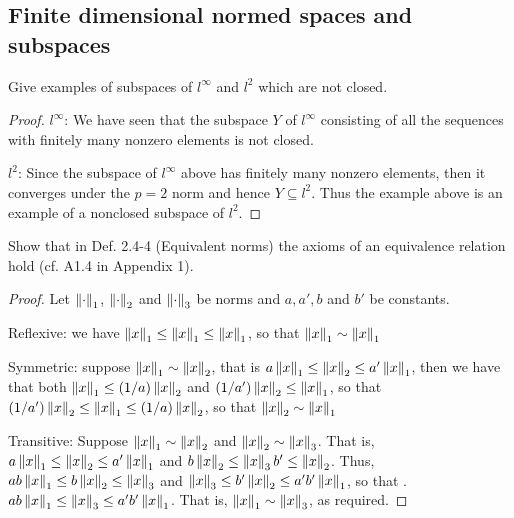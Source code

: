 \subsection{Finite dimensional normed spaces and subspaces}


\begin{exercise}{1}
Give examples of subspaces of $l^\infty$ and $l^2$ which are not closed.
\end{exercise}
\begin{proof}
$l^\infty$: We have seen that the subspace $Y$ of $l^\infty$ consisting of all the sequences with finitely many nonzero elements is not closed.

$l^2$: Since the subspace of $l^\infty$ above has finitely many nonzero elements, then it converges under the $p=2$ norm and hence $Y\subseteq l^2$. Thus the example above is an example of a nonclosed subspace of $l^2$.
\end{proof}

\begin{exercise}{3}
Show that in Def. 2.4-4 (Equivalent norms) the axioms of an equivalence relation hold (cf. A1.4 in Appendix 1).
\end{exercise}
\begin{proof}
Let $\left\lVert \cdot\right\rVert_1$, $\left\lVert \cdot\right\rVert_2$ and $\left\lVert \cdot\right\rVert_3$ be norms and $a,a',b$ and $b'$ be constants.

Reflexive: we have $\left\lVert x\right\rVert_1 \leq\left\lVert x\right\rVert_1 \leq \left\lVert x\right\rVert_1$, so that $\left\lVert x\right\rVert_1\sim \left\lVert x\right\rVert_1$

Symmetric: suppose $\left\lVert x\right\rVert_1\sim \left\lVert x\right\rVert_2$, that is $a\left\lVert x\right\rVert_1 \leq\left\lVert x\right\rVert_2 \leq a'\left\lVert x\right\rVert_1$, then we have that both $\left\lVert x\right\rVert_1\leq (1/a)\left\lVert x\right\rVert_2$ and $(1/a')\left\lVert x\right\rVert_2 \leq \left\lVert x\right\rVert_1$, so that $(1/a')\left\lVert x\right\rVert_2 \leq\left\lVert x\right\rVert_1 \leq (1/a)\left\lVert x\right\rVert_2$, so that $\left\lVert x\right\rVert_2 \sim \left\lVert x\right\rVert_1$

Transitive: Suppose $\left\lVert x\right\rVert_1\sim \left\lVert x\right\rVert_2$ and $\left\lVert x\right\rVert_2 \sim \left\lVert x\right\rVert_3$. That is, $a\left\lVert x\right\rVert_1 \leq \left\lVert x\right\rVert_2 \leq a'\left\lVert x\right\rVert_1$ and $b\left\lVert x\right\rVert_2 \leq \left\lVert x\right\rVert_3 b'\leq \left\lVert x\right\rVert_2$. Thus, $ab\left\lVert x\right\rVert_1 \leq b\left\lVert x\right\rVert_2 \leq \left\lVert x\right\rVert_3$ and $\left\lVert x\right\rVert_3 \leq b'\left\lVert x\right\rVert_2 \leq a'b'\left\lVert x\right\rVert_1$, so that . $ab\left\lVert x\right\rVert_1 \leq \left\lVert x\right\rVert_3 \leq a'b'\left\lVert x\right\rVert_1$. That is, $\left\lVert x\right\rVert_1\sim\left\lVert x\right\rVert_3$, as required.
\end{proof}

